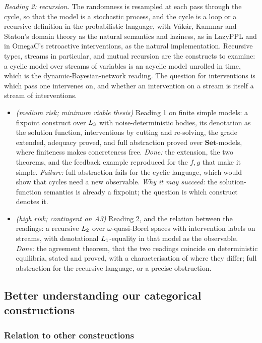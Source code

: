 \emph{Reading 2: recursion.} The randomness is resampled at each pass through the cycle, so that the model is a stochastic process, and the cycle is a loop or a recursive definition in the probabilistic language, with Vákár, Kammar and Staton's domain theory as the natural semantics and laziness, as in LazyPPL and in OmegaC's retroactive interventions, as the natural implementation. Recursive types, streams in particular, and mutual recursion are the constructs to examine: a cyclic model over streams of variables is an acyclic model unrolled in time, which is the dynamic-Bayesian-network reading. The question for interventions is which pass one intervenes on, and whether an intervention on a stream is itself a stream of interventions.
\begin{itemize}[nosep]
\item[A3] \textit{(medium risk; minimum viable thesis)} Reading 1 on finite simple models: a fixpoint construct over $L_{3}$ with noise-deterministic bodies, its denotation as the solution function, interventions by cutting and re-solving, the grade extended, adequacy proved, and full abstraction proved over $\mathbf{Set}$-models, where finiteness makes concreteness free. \emph{Done:} the extension, the two theorems, and the feedback example reproduced for the $f, g$ that make it simple. \emph{Failure:} full abstraction fails for the cyclic language, which would show that cycles need a new observable. \emph{Why it may succeed:} the solution-function semantics is already a fixpoint; the question is which construct denotes it.
\item[A4] \textit{(high risk; contingent on A3)} Reading 2, and the relation between the readings: a recursive $L_{2}$ over $\omega$-quasi-Borel spaces with intervention labels on streams, with denotational $L_{1}$-equality in that model as the observable. \emph{Done:} the agreement theorem, that the two readings coincide on deterministic equilibria, stated and proved, with a characterisation of where they differ; full abstraction for the recursive language, or a precise obstruction.
\end{itemize}

\subsection{Better understanding our categorical constructions}

\subsubsection{Relation to other constructions}\label{sec:prop-relations}

